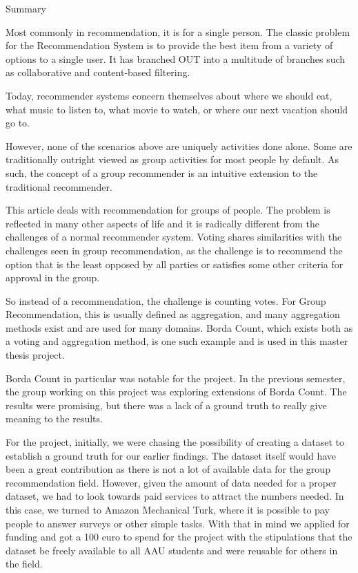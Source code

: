 \begin{titlepage}
\begin{adjustwidth*}{1.9cm}{1.9cm}
\Huge
\begin{center}
Summary
\end{center}
\vspace{.6cm}
\normalsize
Most commonly in recommendation, it is for a single person. The classic problem for the Recommendation System is to provide the best item from a variety of options to a single user. It has branched OUT into a multitude of branches such as collaborative and content-based filtering.

Today, recommender systems concern themselves about where we should eat, what music to listen to, what movie to watch, or where our next vacation should go to.

However, none of the scenarios above are uniquely activities done alone. Some are traditionally outright viewed as group activities for most people by default. As such, the concept of a group recommender is an intuitive extension to the traditional recommender.

This article deals with recommendation for groups of people. The problem is reflected in many other aspects of life and it is radically different from the challenges of a normal recommender system. Voting shares similarities with the challenges seen in group recommendation, as the challenge is to recommend the option that is the least opposed by all parties or satisfies some other criteria for approval in the group.

So instead of a recommendation, the challenge is counting votes. For Group Recommendation, this is usually defined as aggregation, and many aggregation methods exist and are used for many domains. Borda Count, which exists both as a voting and aggregation method, is one such example and is used in this master thesis project.

Borda Count in particular was notable for the project. In the previous semester, the group working on this project was exploring extensions of Borda Count. The results were promising, but there was a lack of a ground truth to really give meaning to the results.

For the project, initially, we were chasing the possibility of creating a dataset to establish a ground truth for our earlier findings. The dataset itself would have been a great contribution as there is not a lot of available data for the group recommendation field. However, given the amount of data needed for a proper dataset, we had to look towards paid services to attract the numbers needed. In this case, we turned to Amazon Mechanical Turk, where it is possible to pay people to answer surveys or other simple tasks. With that in mind we applied for funding and got a 100 euro to spend for the project with the stipulations that the dataset be freely available to all AAU students and were reusable for others in the field.


\end{adjustwidth*}
\end{titlepage}
